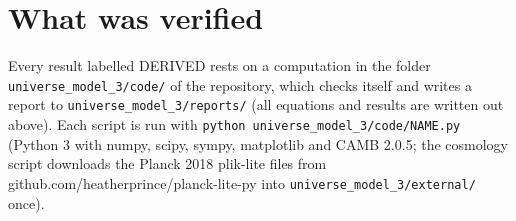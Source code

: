 \documentclass[
  10pt,
]{article}
\begin{document}
\hypertarget{what-was-verified}{%
\section{What was verified}\label{what-was-verified}}

Every result labelled DERIVED rests on a computation in the folder
\texttt{universe\_model\_3/code/} of the repository, which checks itself
and writes a report to \texttt{universe\_model\_3/reports/} (all
equations and results are written out above). Each script is run with
\texttt{python\ universe\_model\_3/code/NAME.py} (Python 3 with numpy,
scipy, sympy, matplotlib and CAMB 2.0.5; the cosmology script downloads
the Planck 2018 plik-lite files from
github.com/heatherprince/planck-lite-py into
\texttt{universe\_model\_3/external/} once).
\end{document}
